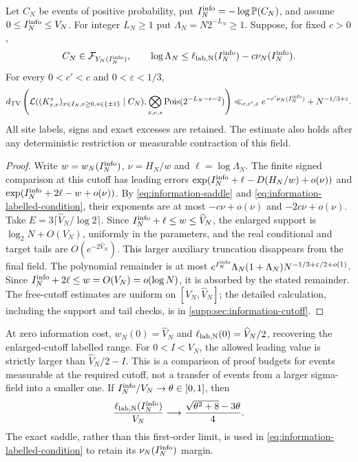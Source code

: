 \begin{proposition}
\label{prop:information-labelled}
Let $C_N$ be events of positive probability, put
$I_N^{\rm info}=-\log\mathbb P(C_N)$, and assume $0\le I_N^{\rm info}\le V_N$. For integer
$L_N\ge1$ put $\Lambda_N=N2^{-L_N}\ge1$. Suppose, for fixed $c>0$,
\begin{equation}\label{eq:information-labelled-condition}
 C_N\in\mathcal F_{Y_N(I_N^{\rm info})},\qquad
 \log\Lambda_N\le\ell_{\rm lab,N}(I_N^{\rm info})-c\nu_N(I_N^{\rm info}).
\end{equation}
For every $0<c'<c$ and $0<\varepsilon<1/3$,
\begin{equation}\label{eq:information-labelled-rate}
 d_{\mathrm{TV}}\left(\mathcal L((K^s_{x,e})_{x\in I_N,e\ge0,s\in\{\pm1\}}\mid C_N),
       \bigotimes_{x,e,s}\operatorname{Pois}(2^{-L_N-e-2})\right)
 \ll_{c,c',\varepsilon} e^{-c'\nu_N(I_N^{\rm info})}+N^{-1/3+\varepsilon}.
\end{equation}
All site labels, signs and exact excesses are retained. The estimate
also holds after any deterministic restriction or measurable contraction
of this field.
\end{proposition}
\begin{proof}
Write $w=w_N(I_N^{\rm info})$, $\nu=H_N/w$ and $\ell=\log\Lambda_N$.
The finite signed comparison at this cutoff has leading errors
$\exp(I_N^{\rm info}+\ell-D(H_N/w)+o(\nu))$ and
$\exp(I_N^{\rm info}+2\ell-w+o(\nu))$.
By \eqref{eq:information-saddle} and
\eqref{eq:information-labelled-condition}, their exponents are at most
$-c\nu+o(\nu)$ and $-2c\nu+o(\nu)$.
Take $E=3\lceil\widehat V_N/\log2\rceil$. Since
$I_N^{\rm info}+\ell\le w\le\widehat V_N$, the enlarged support is
$\log_2N+O(V_N)$, uniformly in the parameters, and the real conditional
and target tails are $O(e^{-2\widehat V_N})$.
This larger auxiliary truncation disappears from the final field. The polynomial remainder is at most
$e^{I_N^{\rm info}}\Lambda_N(1+\Lambda_N)N^{-1/3+\varepsilon/2+o(1)}$.
Since $I_N^{\rm info}+2\ell\le w=O(V_N)=o(\log N)$, it is absorbed by the
stated remainder. The free-cutoff estimates are uniform on
$[V_N,\widehat V_N]$; the detailed calculation, including the support
and tail checks, is in \cref{supp:sec:information-cutoff}.
\end{proof}
At zero information cost, $w_N(0)=\widehat V_N$ and
$\ell_{\rm lab,N}(0)=\widehat V_N/2$, recovering the enlarged-cutoff
labelled range. For $0<I<V_N$, the allowed leading value is strictly
larger than $\widehat V_N/2-I$. This is a comparison of proof budgets
for events measurable at the required cutoff, not a transfer of events
from a larger sigma-field into a smaller one. If $I_N^{\rm info}/V_N\to\theta\in[0,1]$,
then
\begin{equation}\label{eq:information-leading}
 \frac{\ell_{\rm lab,N}(I_N^{\rm info})}{V_N}
       \longrightarrow\frac{\sqrt{\theta^2+8}-3\theta}{4}.
\end{equation}
The exact saddle, rather than this first-order limit, is used in
\eqref{eq:information-labelled-condition} to retain its $\nu_N(I_N^{\rm info})$
margin.


